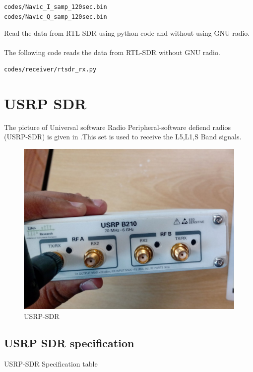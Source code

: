 \begin{lstlisting}
codes/Navic_I_samp_120sec.bin
codes/Navic_Q_samp_120sec.bin
\end{lstlisting}

 Read the data from RTL SDR using python code and without using GNU radio.
\\
\solution \\
The following code reads the data from RTL-SDR without GNU radio.
\begin{lstlisting}
codes/receiver/rtsdr_rx.py
\end{lstlisting}














\section{USRP SDR}
The picture of Universal software Radio Peripheral-software defiend radios (USRP-SDR)  is given in .This set is used to receive the L5,L1,S Band  signals.
\begin{figure}[H]
\centering
\includegraphics[width=0.5\columnwidth]{figs/USRP.png}
\caption{USRP-SDR}
\label{fig:USRP-SDR}
\end{figure}

\subsection{ USRP SDR specification}
 \begin{table}[!ht]
  \centering
 
 \caption{USRP-SDR Specification table }
\end{table}

